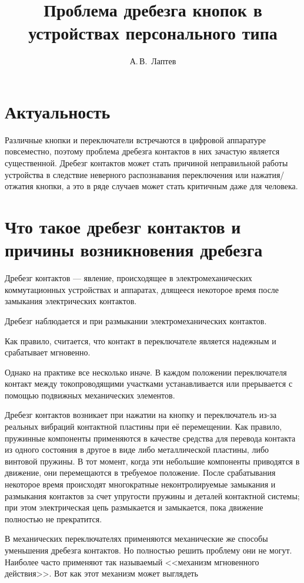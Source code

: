 \documentclass{altsu-report}
\title{Проблема дребезга кнопок в устройствах персонального типа}
\author{А.\,В.~Лаптев}
\institute{Институт цифровых технологий, электроники и физики}
\date{\the\year}
\begin{document}
\section*{Актуальность}

Различные кнопки и переключатели встречаются в цифровой аппаратуре повсеместно, поэтому проблема дребезга контактов в них зачастую является существенной. Дребезг контактов может стать причиной неправильной работы устройства в следствие неверного распознавания переключения или нажатия/отжатия кнопки, а это в ряде случаев может стать критичным даже для человека.

\section*{Что такое дребезг контактов и причины возникновения дребезга}

Дребезг контактов --- явление, происходящее в электромеханических коммутационных устройствах и аппаратах, длящееся некоторое время после замыкания электрических контактов.

Дребезг наблюдается и при размыкании электромеханических контактов.

Как правило, считается, что контакт в переключателе является надежным и срабатывает мгновенно.

Однако на практике все несколько иначе. В каждом положении переключателя контакт между токопроводящими участками устанавливается или прерывается с помощью подвижных механических элементов.

Дребезг контактов возникает при нажатии на кнопку и переключатель из-за реальных вибраций контактной пластины при её перемещении. Как правило, пружинные компоненты применяются в качестве средства для перевода контакта из одного состояния в другое в виде либо металлической пластины, либо винтовой пружины. В тот момент, когда эти небольшие компоненты приводятся в движение, они перемещаются в требуемое положение. После срабатывания некоторое время происходят многократные неконтролируемые замыкания и размыкания контактов за счет упругости пружины и деталей контактной системы; при этом электрическая цепь размыкается и замыкается, пока движение полностью не прекратится.

В механических переключателях применяются механические же способы уменьшения дребезга контактов. Но полностью решить проблему они не могут. Наиболее часто применяют так называемый <<механизм мгновенного действия>>. Вот как этот механизм может выглядеть
\end{document}
